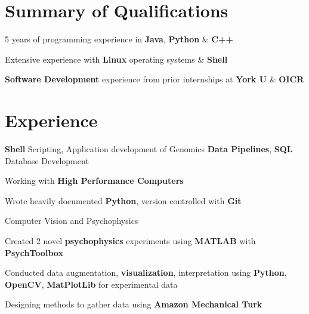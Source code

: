 \documentclass[]{chandan-cv}
\begin{document}
\begin{minipage}[t]{0.66\textwidth}


\section{Summary of Qualifications}
\runsubsection{ }
\descript{ }
\location{ }
\vspace{\topsep} %
\begin{tightemize}
	\item 5 years of programming experience in \textbf{Java}, \textbf{Python} \& \textbf{C++}
	\item Extensive experience with \textbf{Linux} operating systems \& \textbf{Shell}
	\item \textbf{Software Development} experience from prior internships at \textbf{York U} \& \textbf{OICR}
\end{tightemize}
\sectionsep


\section{Experience}
\begin{tightemize}
	\item \textbf{Shell} Scripting, Application development of Genomics \textbf{Data Pipelines}, \textbf{SQL} Database Development
	\item Working with \textbf{High Performance Computers}
	\item Wrote heavily documented \textbf{Python}, version controlled with \textbf{Git}
\end{tightemize}
\sectionsep

\begin{tightemize}
	\item Computer Vision and Psychophysics
	\item Created 2 novel \textbf{psychophysics} experiments using \textbf{MATLAB} with \textbf{PsychToolbox}
	\item Conducted data augmentation, \textbf{visualization}, interpretation using \textbf{Python}, \textbf{OpenCV}, \textbf{MatPlotLib} for experimental data
	\item Designing methods to gather data using \textbf{Amazon Mechanical Turk}
\end{tightemize}
\sectionsep


\end{minipage}
\end{document}
